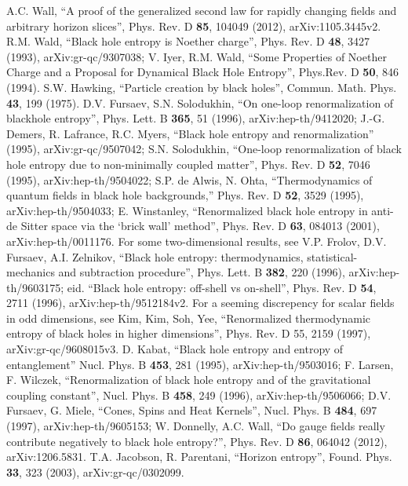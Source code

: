 \documentclass{article}
\begin{document}
\begin{thebibliography}{99}
A.C. Wall, ``A proof of the generalized second law for rapidly changing fields and arbitrary horizon slices'', Phys. Rev. D \textbf{85}, 104049 (2012), arXiv:1105.3445v2.
R.M. Wald, ``Black hole entropy is Noether charge'', Phys. Rev. D \textbf{48}, 3427 (1993), arXiv:gr-qc/9307038;
V. Iyer, R.M. Wald, ``Some Properties of Noether Charge and a Proposal for Dynamical Black Hole Entropy'', Phys.Rev. D \textbf{50},  846 (1994).
S.W. Hawking, ``Particle creation by black holes'', Commun. Math. Phys. \textbf{43}, 199 (1975).
D.V. Fursaev, S.N. Solodukhin, ``On one-loop renormalization of blackhole
entropy'', Phys. Lett. B \textbf{365}, 51 (1996), arXiv:hep-th/9412020; 
J.-G. Demers, R. Lafrance, R.C. Myers, ``Black hole entropy and renormalization''
(1995), arXiv:gr-qc/9507042; 
S.N. Solodukhin, ``One-loop renormalization of black hole entropy due to non-minimally coupled matter'', 
Phys. Rev. D \textbf{52}, 7046 (1995), arXiv:hep-th/9504022; 
S.P. de Alwis, N. Ohta, ``Thermodynamics of quantum fields in black hole backgrounds,'' Phys.
Rev. D \textbf{52}, 3529 (1995), arXiv:hep-th/9504033; 
E. Winstanley, ``Renormalized black hole entropy in anti-de Sitter space via the `brick wall' method'',
Phys. Rev. D \textbf{63}, 084013 (2001), arXiv:hep-th/0011176. 
For some two-dimensional results, see V.P. Frolov, D.V. Fursaev, A.I. Zelnikov,
``Black hole entropy: thermodynamics, statistical-mechanics and subtraction
procedure'', Phys. Lett. B \textbf{382}, 220 (1996), arXiv:hep-th/9603175; eid.
``Black hole entropy: off-shell vs on-shell'', Phys. Rev. D \textbf{54}, 2711 (1996),
arXiv:hep-th/9512184v2.
For a seeming discrepency for scalar fields in odd dimensions, see Kim, Kim,
Soh, Yee, ``Renormalized thermodynamic entropy of black holes in higher
dimensions'', Phys. Rev. D 55, 2159 (1997), arXiv:gr-qc/9608015v3. 
D. Kabat, ``Black hole entropy and entropy of entanglement'' Nucl. Phys. B \textbf{453}, 281 (1995), arXiv:hep-th/9503016; 
F. Larsen, F. Wilczek, ``Renormalization of black hole entropy and of the gravitational coupling
constant'', Nucl. Phys. B \textbf{458}, 249 (1996), arXiv:hep-th/9506066; 
D.V. Fursaev, G. Miele, ``Cones, Spins and Heat Kernels'', Nucl. Phys. B \textbf{484}, 697 (1997), arXiv:hep-th/9605153; 
W. Donnelly, A.C. Wall, ``Do gauge fields really contribute negatively to black hole entropy?'', Phys. Rev. D \textbf{86}, 064042 (2012), arXiv:1206.5831.
T.A. Jacobson, R. Parentani, ``Horizon entropy'', Found. Phys. \textbf{33}, 323 (2003), arXiv:gr-qc/0302099.

\end{thebibliography}
\end{document}
